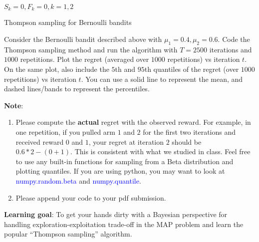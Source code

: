 \begin{algorithm}[H]
\SetAlgoLined
$S_k=0, F_k=0,  k=1,2$


\caption{Thompson sampling for Bernoulli bandits}
\end{algorithm}

\newpage

Consider the Bernoulli bandit described above with $\mu_1=0.4, \mu_2=0.6$. Code the Thompson sampling method and run the algorithm with $T=2500$ iterations and $1000$ repetitions. Plot the regret (averaged over $1000$ repetitions) vs iteration $t$. On the same plot, also include the $5$th and $95$th quantiles of the regret (over $1000$ repetitions) vs iteration $t$. You can use a solid line to represent the mean, and dashed lines/bands to represent the percentiles. 

\textbf{Note}:
\begin{enumerate}
    \item Please compute the \textbf{actual} regret with the observed reward. For example, in one repetition, if you pulled arm $1$ and $2$ for the first two iterations and received reward $0$ and $1$, your regret at iteration $2$ should be $0.6*2-(0+1)$. This is consistent with what we studied in class. Feel free to use any built-in functions for sampling from a Beta distribution and plotting quantiles. If you are using python, you may want to look at \textcolor{blue}{numpy.random.beta} and \textcolor{blue}{numpy.quantile}. 
    \item Please append your code to your pdf submission.
\end{enumerate}
 

\textbf{Learning goal}: To get your hands dirty with a Bayesian perspective for handling exploration-exploitation trade-off in the MAP problem and learn the popular ``Thompson sampling'' algorithm. 
 \\